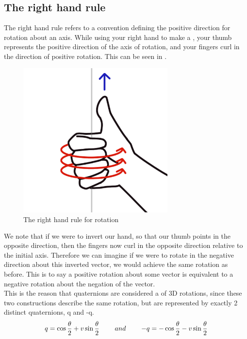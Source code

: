 \subsection{The right hand rule}
The right hand rule refers to a convention defining the positive direction for rotation about an axis. While using your right hand to make a , your thumb represents the positive direction of the axis of rotation, and your fingers curl in the direction of positive rotation. This can be seen in .\\

\begin{figure}[h]
    \centering
    \includegraphics[width=0.7\textwidth]{figures/right-hand-rule.png}
    \caption{The right hand rule for rotation}
    \label{fig:right-hand-rule}
\end{figure}

We note that if we were to invert our hand, so that our thumb points in the opposite direction, then the fingers now curl in the opposite direction relative to the initial axis. Therefore we can imagine if we were to rotate in the negative direction about this inverted vector, we would achieve the same rotation as before. This is to say a positive rotation about some vector is equivalent to a negative rotation about the negation of the vector.\\
This is the reason that quaternions are considered a  of 3D rotations, since these two constructions describe the same rotation, but are represented by exactly 2 distinct quaternions, q and -q.
$$ q = \cos{\frac{\theta}{2}} + v\sin{\frac{\theta}{2}} \operatorname{\operatorname{\: \: \: \:} \operatorname{\: \: \: \:}} and \operatorname{\operatorname{\: \: \: \:} \operatorname{\: \: \: \:}} -q = -\cos{\frac{\theta}{2}} - v\sin{\frac{\theta}{2}}$$





